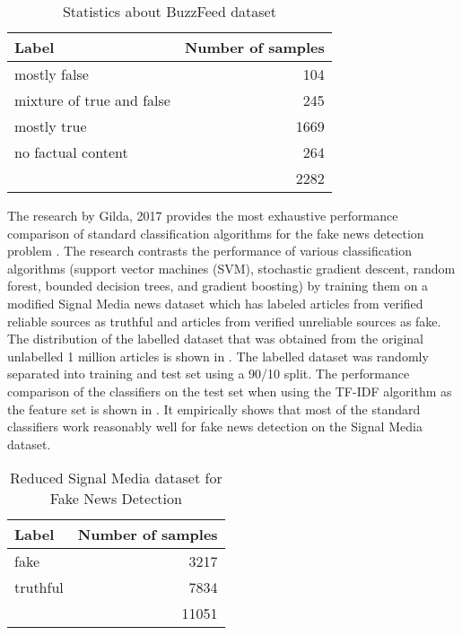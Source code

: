 \begin{table}[h]
\begin{center}
\caption{Statistics about BuzzFeed dataset}
\label{tbl:buzzfeed_dataset}
\begin{tabular}{lr}
\toprule 
Label&Number of samples \\
\midrule 
mostly false&104 \\
mixture of true and false&245 \\
mostly true&1669 \\
no factual content&264 \\
\midrule
&2282 \\
\bottomrule
\end{tabular}
\end{center}
\end{table}

The research by Gilda, 2017 provides the most exhaustive performance comparison of standard classification algorithms for the fake news detection problem \cite{gilda2017evaluating}. The research contrasts the performance of various classification algorithms  (support vector machines (SVM), stochastic gradient descent, random forest, bounded decision trees, and gradient boosting) by training them on a modified Signal Media news dataset \cite{corney2016million} which has labeled articles from verified reliable sources as truthful and articles from verified unreliable sources as fake. The distribution of the labelled dataset that was obtained from the original unlabelled 1 million articles is shown in . The labelled dataset was randomly separated into training and test set using a 90/10 split. The performance comparison of the classifiers on the test set when using the TF-IDF algorithm as the feature set is shown in  \cite{gilda2017evaluating}. It empirically shows that most of the standard classifiers work reasonably well for fake news detection on the Signal Media dataset.

\begin{table}[h]
\begin{center}
\caption{Reduced Signal Media dataset for Fake News Detection}
\label{tbl:reduced_signal_media_dataset}
\begin{tabular}{lr}
\toprule 
Label&Number of samples \\
\midrule 
fake&3217 \\
truthful&7834 \\
\midrule
&11051 \\
\bottomrule
\end{tabular}
\end{center}
\end{table}

